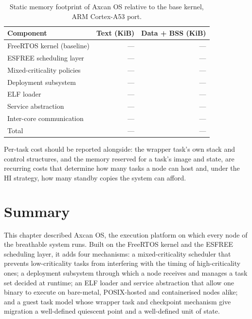 \begin{table}[t]
  \centering
  \caption{Static memory footprint of Axcan OS relative to the base kernel,
           ARM Cortex-A53 port.}
  \label{tab:os:footprint}
  \small
  \begin{tabular}{@{}lrr@{}}
    \toprule
    Component & Text (KiB) & Data + BSS (KiB) \\
    \midrule
    FreeRTOS kernel (baseline)      & --- & --- \\
    ESFREE scheduling layer         & --- & --- \\
    Mixed-criticality policies      & --- & --- \\
    Deployment subsystem            & --- & --- \\
    ELF loader                      & --- & --- \\
    Service abstraction             & --- & --- \\
    Inter-core communication        & --- & --- \\
    \midrule
    Total                           & --- & --- \\
    \bottomrule
  \end{tabular}
\end{table}

Per-task cost should be reported alongside: the wrapper task's own stack and
control structures, and the memory reserved for a task's image and state, are
recurring costs that determine how many tasks a node can host and, under the
\textsf{HI} strategy, how many standby copies the system can afford.

\section{Summary}\label{sec:os:summary}

This chapter described Axcan OS, the execution platform on which every node of
the breathable system runs. Built on the FreeRTOS kernel and the ESFREE
scheduling layer, it adds four mechanisms: a mixed-criticality scheduler that
prevents low-criticality tasks from interfering with the timing of
high-criticality ones; a deployment subsystem through which a node receives
and manages a task set decided at runtime; an ELF loader and service
abstraction that allow one binary to execute on bare-metal, POSIX-hosted and
containerised nodes alike; and a guest task model whose wrapper task and
checkpoint mechanism give migration a well-defined quiescent point and a
well-defined unit of state.

